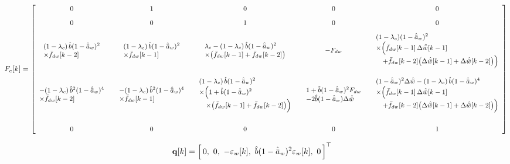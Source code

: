 \documentclass[11pt,a4paper,fontset=none]{ctexart}
\newcommand{\ba}{\bar{a}}
\newcommand{\bw}{\bar{w}}
\newcommand{\dWh}{\Delta\hat{\bw}}
\newcommand{\ah}{\hat{\ba}_w}
\newcommand{\bh}{\hat{b}}
\newcommand{\fd}{\bar f_{dw}}
\begin{document}
\begin{landscape}
\thispagestyle{empty}
\begin{align*}
F_e[k] = {\small\begin{bmatrix}
0 & 1 & 0 & 0 & 0 \\[8pt]
0 & 0 & 1 & 0 & 0 \\[8pt]
\begin{array}{l} (1-\lambda_c)\,\bh(1-\ah)^{2} \\ \times\fd[k-2] \end{array} &
\begin{array}{l} (1-\lambda_c)\,\bh(1-\ah)^{2} \\ \times\fd[k-1] \end{array} &
\begin{array}{l} \lambda_c - (1-\lambda_c)\,\bh(1-\ah)^{2} \\ \times\bigl(\fd[k-1] + \fd[k-2]\bigr) \end{array} &
-F_{dw} &
\begin{array}{l} (1-\lambda_c)(1-\ah)^{2} \\ \times\Bigl(\fd[k-1]\,\dWh[k-1] \\ \quad + \fd[k-2]\bigl(\dWh[k-1] + \dWh[k-2]\bigr)\Bigr) \end{array} \\[30pt]
\begin{array}{l} -(1-\lambda_c)\,\bh^{2}(1-\ah)^{4} \\ \times\fd[k-2] \end{array} &
\begin{array}{l} -(1-\lambda_c)\,\bh^{2}(1-\ah)^{4} \\ \times\fd[k-1] \end{array} &
\begin{array}{l} (1-\lambda_c)\,\bh(1-\ah)^{2} \\ \times\Bigl(1 + \bh(1-\ah)^{2} \\ \quad \times\bigl(\fd[k-1] + \fd[k-2]\bigr)\Bigr) \end{array} &
\begin{array}{l} 1 + \bh(1-\ah)^{2}F_{dw} \\ - 2\bh(1-\ah)\dWh \end{array} &
\begin{array}{l} (1-\ah)^{2}\dWh - (1-\lambda_c)\,\bh(1-\ah)^{4} \\ \times\Bigl(\fd[k-1]\,\dWh[k-1] \\ \quad + \fd[k-2]\bigl(\dWh[k-1] + \dWh[k-2]\bigr)\Bigr) \end{array} \\[36pt]
0 & 0 & 0 & 0 & 1
\end{bmatrix}}
\end{align*}

\begin{align*}
\mathbf{q}[k] &= \Bigl[\,0,\ 0,\ -\varepsilon_w[k],\ \bh(1-\ah)^{2}\varepsilon_w[k],\ 0\,\Bigr]^{\top}
\end{align*}
\end{landscape}
\end{document}
